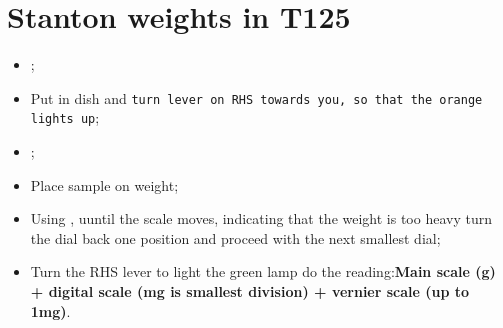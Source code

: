 \section{Stanton weights in T125}
  \begin{itemize}
  	\item {};
  	\item Put in dish and \texttt{turn lever on RHS towards you, so that the orange lights up};
  	\item {};
  	\item Place sample on weight;
  	\item Using , uuntil the scale moves, indicating that the weight is too heavy \ira turn the dial back one position and proceed with the next smallest dial;
  	\item Turn the RHS lever to light the green lamp \ira do the reading:\newline \textbf{Main scale (g) + digital scale (mg is smallest division) + vernier scale (up to 1mg)}.
  \end{itemize}
\newpage